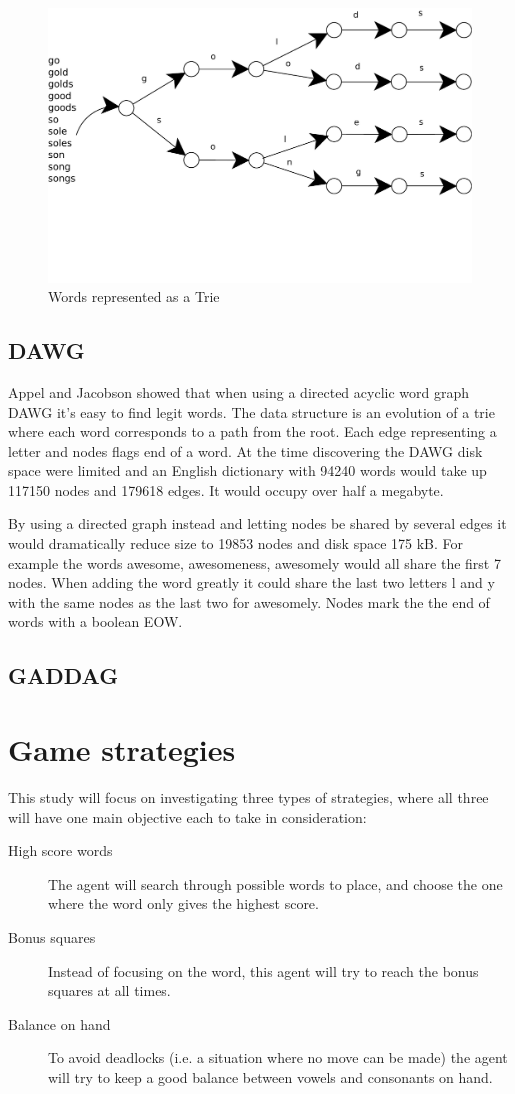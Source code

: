 \documentclass[a4paper, 12pt]{report}
\begin{document}
\begin{figure}
\centering
\includegraphics[scale=0.6]{trie}
\caption{Words represented as a Trie}
\end{figure}
\subsection{DAWG}
Appel and Jacobson \cite{fastest} showed that when using a directed acyclic word graph DAWG it's easy to find legit words. The data structure is an evolution of a trie where each word corresponds to a path from the root. Each edge representing a letter and nodes flags end of a word. At the time discovering the DAWG disk space were limited and an English dictionary with 94240 words would take up 117150 nodes and 179618 edges. It would occupy over half a megabyte.

By using a directed graph instead and letting nodes be shared by several edges it would dramatically reduce size to 19853 nodes and disk space 175 kB. For example the words awesome, awesomeness, awesomely would all share the first 7 nodes. When adding the word greatly it could share the last two letters l and y with the same nodes as the last two for awesomely. Nodes mark the the end of words with a boolean EOW.

\subsection{GADDAG}
\section{Game strategies}
This study will focus on investigating three types of strategies, where all three will have one main objective each to take in consideration:
\begin{description}
\item[High score words] The agent will search through possible words to place, and choose the one where the word only gives the highest score.
\item[Bonus squares] Instead of focusing on the word, this agent will try to reach the bonus squares at all times.
\item[Balance on hand] To avoid deadlocks (i.e. a situation where no move can be made) the agent will try to keep a good balance between vowels and consonants on hand. 
\end{description}
\end{document}
